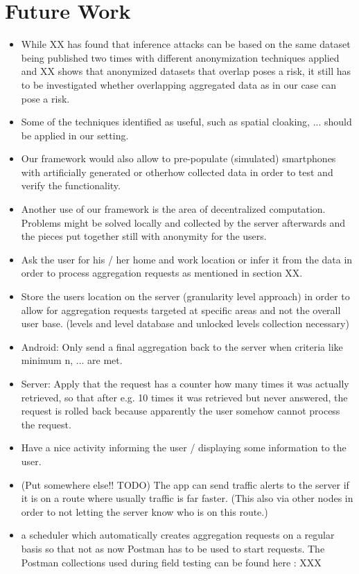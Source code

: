 \section{Future Work}
\begin{itemize}
	\item While XX has found that inference attacks can be based on the same dataset being published two times with different anonymization techniques applied and XX shows that anonymized datasets that overlap poses a risk, it still has to be investigated whether overlapping aggregated data as in our case can pose a risk.
	\item Some of the techniques identified as useful, such as spatial cloaking, ... should be applied in our setting.
	\item Our framework would also allow to pre-populate (simulated) smartphones with artificially generated or otherhow collected data in order to test and verify the functionality.
	\item Another use of our framework is the area of decentralized computation. Problems might be solved locally and collected by the server afterwards and the pieces put together still with anonymity for the users.
	\item Ask the user for his / her home and work location or infer it from the data in order to process aggregation requests as mentioned in section XX.
	\item Store the users location on the server (granularity level approach) in order to allow for aggregation requests targeted at specific areas and not the overall user base. (levels and level database and unlocked levels collection necessary)
	\item Android: Only send a final aggregation back to the server when criteria like minimum n, ... are met.
	\item Server: Apply that the request has a counter how many times it was actually retrieved, so that after e.g. 10 times it was retrieved but never answered, the request is rolled back because apparently the user somehow cannot process the request.
	\item Have a nice activity informing the user / displaying some information to the user.
	\item (Put somewhere else!! TODO) The app can send traffic alerts to the server if it is on a route where usually traffic is far faster. (This also via other nodes in order to not letting the server know who is on this route.)
	\item a scheduler which automatically creates aggregation requests on a regular basis so that not as now Postman has to be used to start requests. The Postman collections used during field testing can be found here : XXX

\end{itemize}

